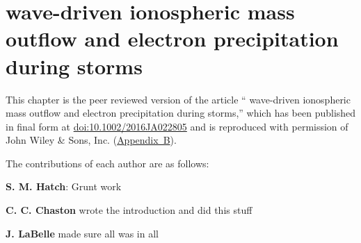 
\chapter{\Alf wave-driven ionospheric mass outflow
and electron precipitation during storms}
\label{chp:2}

This chapter is the peer reviewed version of the article ``\Alf
wave-driven ionospheric mass outflow and electron precipitation during
storms,'' which has been published in final form at
\href{https://doi.org/10.1002/2016JA022805}{doi:10.1002/2016JA022805}
and is reproduced with permission of John Wiley \& Sons,
Inc. (\hyperref[app:B]{Appendix~B}).

The contributions of each author are as follows:

\textbf{S. M. Hatch}: Grunt work

\textbf{C. C. Chaston} wrote the introduction and did this stuff 

\textbf{J. LaBelle} made sure all was in all




